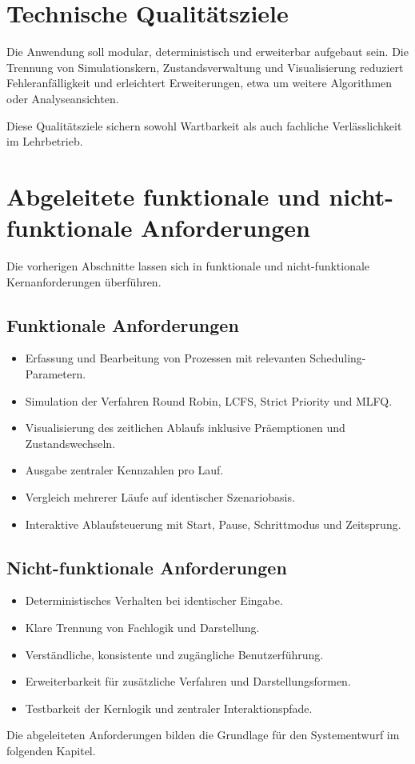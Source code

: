 \section{Technische Qualitätsziele}

Die Anwendung soll modular, deterministisch und erweiterbar aufgebaut sein. Die Trennung von Simulationskern, Zustandsverwaltung und Visualisierung reduziert Fehleranfälligkeit und erleichtert Erweiterungen, etwa um weitere Algorithmen oder Analyseansichten.

Diese Qualitätsziele sichern sowohl Wartbarkeit als auch fachliche Verlässlichkeit im Lehrbetrieb.

\section{Abgeleitete funktionale und nicht-funktionale Anforderungen}

Die vorherigen Abschnitte lassen sich in funktionale und nicht-funktionale Kernanforderungen überführen.

\subsection*{Funktionale Anforderungen}

\begin{itemize}
    \item Erfassung und Bearbeitung von Prozessen mit relevanten Scheduling-Parametern.
    \item Simulation der Verfahren Round Robin, LCFS, Strict Priority und MLFQ.
    \item Visualisierung des zeitlichen Ablaufs inklusive Präemptionen und Zustandswechseln.
    \item Ausgabe zentraler Kennzahlen pro Lauf.
    \item Vergleich mehrerer Läufe auf identischer Szenariobasis.
    \item Interaktive Ablaufsteuerung mit Start, Pause, Schrittmodus und Zeitsprung.
\end{itemize}

\subsection*{Nicht-funktionale Anforderungen}

\begin{itemize}
    \item Deterministisches Verhalten bei identischer Eingabe.
    \item Klare Trennung von Fachlogik und Darstellung.
    \item Verständliche, konsistente und zugängliche Benutzerführung.
    \item Erweiterbarkeit für zusätzliche Verfahren und Darstellungsformen.
    \item Testbarkeit der Kernlogik und zentraler Interaktionspfade.
\end{itemize}

Die abgeleiteten Anforderungen bilden die Grundlage für den Systementwurf im folgenden Kapitel.
\fi
